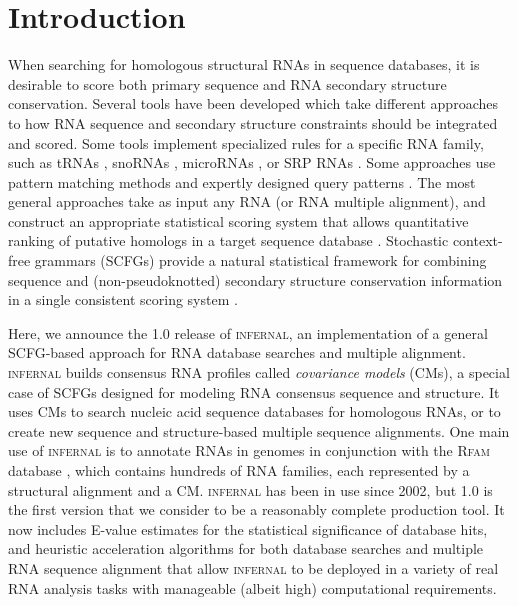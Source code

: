 \section{Introduction}

When searching for homologous structural RNAs in sequence databases,
it is desirable to score both primary sequence and RNA secondary
structure conservation. Several tools have been developed which take
different approaches to how RNA sequence and secondary structure
constraints should be integrated and scored. Some tools implement
specialized rules for a specific RNA family, such as tRNAs
\citep{LoweEddy97,Laslett04}, snoRNAs \citep{LoweEddy99,Schattner06},
microRNAs \citep{Lai03,Lim03}, or SRP RNAs \citep{Lai03,Lim03}. Some
approaches use pattern matching methods and expertly designed query
patterns \citep{Macke01}. The most general approaches take as input
any RNA (or RNA multiple alignment), and construct an appropriate
statistical scoring system that allows quantitative ranking of
putative homologs in a target sequence database
\citep{Gautheret01,ZhangBafna05,Huang08}.  Stochastic context-free
grammars (SCFGs) provide a natural statistical framework for combining
sequence and (non-pseudoknotted) secondary structure conservation
information in a single consistent scoring system
\citep{Sakakibara94c,Eddy94,Brown00,Durbin98}.

Here, we announce the 1.0 release of \textsc{infernal}, an
implementation of a general SCFG-based approach for RNA database
searches and multiple alignment. \textsc{infernal} builds consensus
RNA profiles called \emph{covariance models} (CMs), a special case of
SCFGs designed for modeling RNA consensus sequence and structure. It
uses CMs to search nucleic acid sequence databases for homologous
RNAs, or to create new sequence and structure-based multiple sequence
alignments. One main use of \textsc{infernal} is to annotate RNAs in
genomes in conjunction with the \textsc{Rfam} database
\citep{Gardner09}, which contains hundreds of RNA families,
each represented by a structural alignment and a CM. \textsc{infernal}
has been in use since 2002, but 1.0 is the first version that we
consider to be a reasonably complete production tool. It now includes
E-value estimates for the statistical significance of database hits,
and heuristic acceleration algorithms for both database searches and
multiple RNA sequence alignment that allow \textsc{infernal} to be
deployed in a variety of real RNA analysis tasks with manageable
(albeit high) computational requirements.

